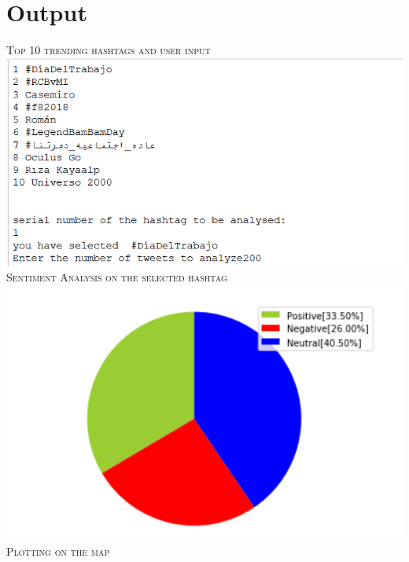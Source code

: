 \documentclass[12pt]{article}
\begin{document}
\section{Output}
\textsc{Top 10 trending hashtags and user input}\\[0.5cm]
\includegraphics{Output_1.PNG} \\ [2cm]
\newpage
\textsc{Sentiment Analysis on the selected hashtag }\\[0.5cm]
\includegraphics{Output_2.PNG} \\ [2cm]
\newpage
\textsc{Plotting on the map}\\[0.5cm]
\end{document}
